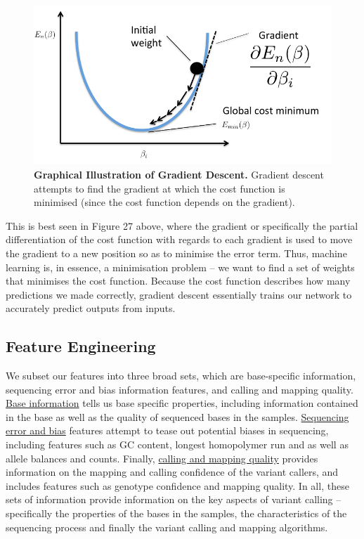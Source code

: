\documentclass{article}
\begin{document}
\begin{figure}[H]
\includegraphics[width=\textwidth]{gradientdescent.png}
\caption{\textbf{Graphical Illustration of Gradient Descent.} Gradient descent attempts to find the gradient at which the cost function is minimised (since the cost function depends on the gradient).}
\centering
\end{figure}
 This is best seen in Figure 27 above, where the gradient or specifically the partial differentiation of the cost function with regards to each gradient is used to move the gradient to a new position so as to minimise the error term. Thus, machine learning is, in essence, a minimisation problem -- we want to find a set of weights that minimises the cost function. Because the cost function describes how many predictions we made correctly, gradient descent essentially trains our network to accurately predict outputs from inputs.

\newpage
\subsection{Feature Engineering}
We subset our features into three broad sets, which are base-specific information, sequencing error and bias information features, and calling and mapping quality. \underline{Base information} tells us base specific properties, including information contained in the base as well as the quality of sequenced bases in the samples. \underline{Sequencing error and bias} features attempt to tease out potential biases in sequencing, including features such as GC content, longest homopolymer run and as well as allele balances and counts. Finally, \underline{calling and mapping quality} provides information on the mapping and calling confidence of the variant callers, and includes features such as genotype confidence and mapping quality. In all, these sets of information provide information on the key aspects of variant calling -- specifically the properties of the bases in the samples, the characteristics of the sequencing process and finally the variant calling and mapping algorithms.\\\\
\end{document}
